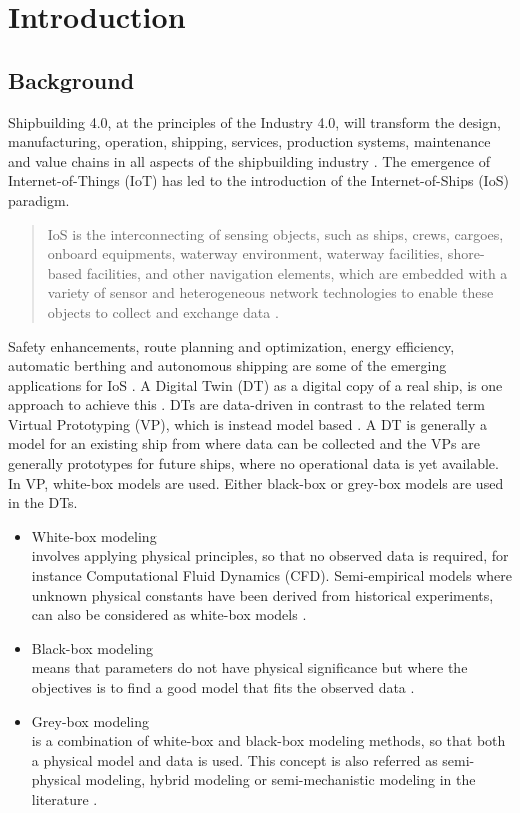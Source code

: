 \chapter{Introduction}
\section{Background}
Shipbuilding 4.0, at the principles of the Industry 4.0, will transform the design, manufacturing, operation, shipping, services, production systems, maintenance and value chains in all aspects of the shipbuilding 
industry \cite{stanic_toward_2018}.
The emergence of Internet-of-Things (IoT) has led to the introduction of the Internet-of-Ships (IoS) paradigm. \begin{quote} IoS is the interconnecting of sensing objects, such as ships, crews, cargoes, onboard equipments, waterway environment, waterway facilities, shore-based facilities, and other navigation elements, which are embedded with a variety of sensor and heterogeneous network technologies to enable these objects to collect and exchange data \cite{liu_internet_2016-1}.\end{quote}
Safety enhancements, route planning and optimization, energy efficiency, automatic berthing and autonomous shipping are some of the emerging applications for IoS \cite{aslam_internet_2020}.
A Digital Twin (DT) as a digital copy of a real ship, is one approach to achieve this \cite{chen_review_2021}. 
DTs are data-driven in contrast to the related term Virtual Prototyping (VP), which is instead model based \cite{major_framework_2021}. A DT is generally a model for an existing ship from where data can be collected and the VPs are generally prototypes for future ships, where no operational data is yet available.
In VP, white-box models are used. Either black-box or grey-box models are used in the DTs. 

\begin{itemize}
    \item White-box modeling \\
    involves applying physical principles, so that no observed data is required, for instance Computational Fluid Dynamics (CFD). Semi-empirical models where unknown physical constants have been derived from historical experiments, can also be considered as white-box models \cite{leifsson_grey-box_2008}.  

    \item Black-box modeling \\
    means that parameters do not have physical significance but where the objectives is to find a good model that fits the observed data \cite{lindskog_tools_1995}.
    
    \item Grey-box modeling \\
    is a combination of white-box and black-box modeling methods, so that both a physical model and data is used. This concept is also referred as semi-physical modeling, hybrid modeling or semi-mechanistic modeling in the literature \cite{leifsson_grey-box_2008}. 
\end{itemize}

